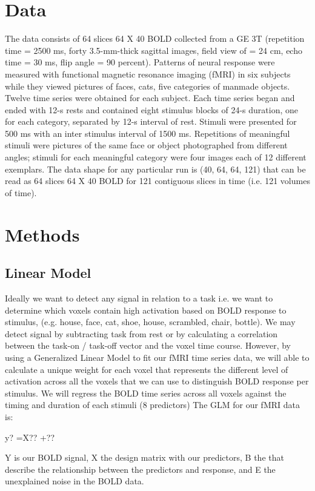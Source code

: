 \documentclass[11pt]{article}
\begin{document}
\section{Data}

The data consists of 64 slices  64 X 40 BOLD collected from a GE 3T (repetition 
time = 2500 ms, forty 3.5-mm-thick sagittal images, field view of = 24 cm, echo 
time = 30 ms, flip angle = 90 percent). Patterns of neural response were 
measured with functional magnetic resonance imaging (fMRI) in six subjects 
while they viewed pictures of faces, cats, five categories of manmade objects. 
Twelve time series were obtained for each subject. Each time series began and 
ended with 12-s rests and contained eight stimulus blocks of 24-s duration, one 
for each category, separated by 12-s interval of rest. Stimuli were presented 
for 500 ms with an inter stimulus interval of 1500 ms. Repetitions of 
meaningful stimuli were pictures of the same face or object photographed from 
different angles; stimuli for each meaningful category were four images each of 
12 different exemplars. The data shape for any particular run is (40, 64, 64, 
121) that can be read as 64 slices 64 X 40 BOLD for 121 contiguous slices in 
time (i.e. 121 volumes of time).


\section{Methods}

\subsection{Linear Model}
Ideally we want to detect any signal in relation to a task i.e. we want to determine which voxels contain high activation based on BOLD response to stimulus, (e.g. house, face, cat, shoe, house, scrambled, chair, bottle). We may detect signal by subtracting task from rest or by calculating a correlation between the task-on / task-off vector and the voxel time course. However, by using a Generalized Linear Model to fit our fMRI time series data, we will able to calculate a unique weight for each voxel that represents the different level of activation across all the voxels that we can use to distinguish BOLD response per stimulus.  We will regress the BOLD time series across all voxels against the timing and duration of each stimuli (8 predictors) The GLM for our fMRI data is:

y? =X?? +??

Y is our BOLD signal, X the design matrix with our predictors, B the that describe the relationship between the predictors and response, and E the unexplained noise in the BOLD data.
\end{document}
